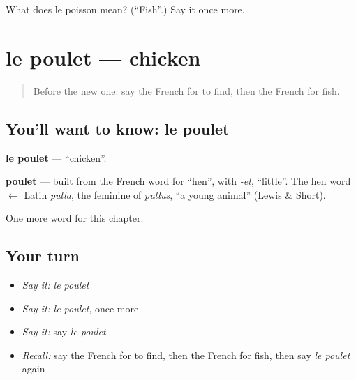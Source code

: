 \begin{tcolorbox}[breakable,colback=teal!4,colframe=teal!35!black,title={Before you move on}]
What does le poisson mean? (\textquotedblleft{}Fish\textquotedblright{}.) Say it once more.
\end{tcolorbox}
\section[le poulet]{le poulet — chicken}

\label{lesson:FR-C67-poulet}



\begin{quote}
Before the new one: say the French for to find, then the French for fish.
\end{quote}

\subsection*{You'll want to know: le poulet}
\textbf{le poulet} — \textquotedblleft{}chicken\textquotedblright{}.

\begin{cousinweb}
\textbf{poulet} — built from the French word for \textquotedblleft{}hen\textquotedblright{}, with \emph{-et}, \textquotedblleft{}little\textquotedblright{}. The hen word $\leftarrow$ Latin \emph{pulla}, the feminine of \emph{pullus}, \textquotedblleft{}a young animal\textquotedblright{} (Lewis \& Short).
\end{cousinweb}

\begin{grammarlens}[title={What you've built}]
One more word for this chapter.
\end{grammarlens}

\subsection*{Your turn}
\begin{itemize}
\raggedright
  \item \emph{Say it:} \emph{le poulet}
  \item \emph{Say it:} \emph{le poulet}, once more
  \item \emph{Say it:} say \emph{le poulet}
  \item \emph{Recall:} say the French for to find, then the French for fish, then say \emph{le poulet} again
\end{itemize}

